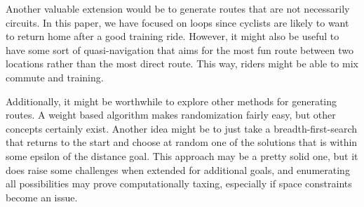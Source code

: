 \documentclass[twocolumn,12pt]{article}
\begin{document}
Another valuable extension would be to generate routes that are not necessarily
circuits. In this paper, we have focused on loops since cyclists are likely to
want to return home after a good training ride. However, it might also be useful
to have some sort of quasi-navigation that aims for the most fun route
between two locations rather than the most direct route. This way, riders might
be able to mix commute and training.

Additionally, it might be worthwhile to explore other methods for generating
routes. A weight based algorithm makes randomization fairly easy, but other
concepts certainly exist. Another idea might be to just take a
breadth-first-search that returns to the start and choose at random one of the
solutions that is within some epsilon of the distance goal. This approach may
be a pretty solid one, but it does raise some challenges when extended for
additional goals, and enumerating all possibilities may prove computationally
taxing, especially if space constraints become an issue.


\raggedright

\end{document}
